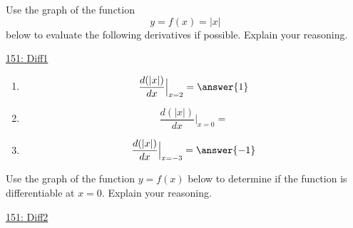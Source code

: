 \documentclass{ximera}
\begin{document}
\begin{exploration}  \label{Exp9485rf5r}

Use the graph of the function 
\[
    y = f(x) = |x|
\]
below to evaluate the following derivatives if possible. Explain your reasoning.

\begin{onlineOnly}
    \begin{center}
\end{center}
\end{onlineOnly}

\href{https://www.desmos.com/calculator/us2fruzbra}{151: Diff1}

\begin{enumerate}
\item 
\[
 \frac{d (|x|)}{dx}\Big|_{x=2} = \answer{1}
\]

\item 
\[
 \frac{d (|x|)}{dx}\Big|_{x=0} = 
\]

\item 
\[
 \frac{d (|x|)}{dx}\Big|_{x=-3} = \answer{-1}
\]
\end{enumerate}
\end{exploration}


\begin{exploration} \label{Exp4kfgk4g4}
Use the graph of the function $y=f(x)$ below to determine if the function is differentiable at $x=0$. Explain your reasoning.

\begin{onlineOnly}
    \begin{center}
\end{center}
\end{onlineOnly}

\href{https://www.desmos.com/calculator/ov8qt938ot}{151: Diff2}
\end{exploration}
\end{document}
